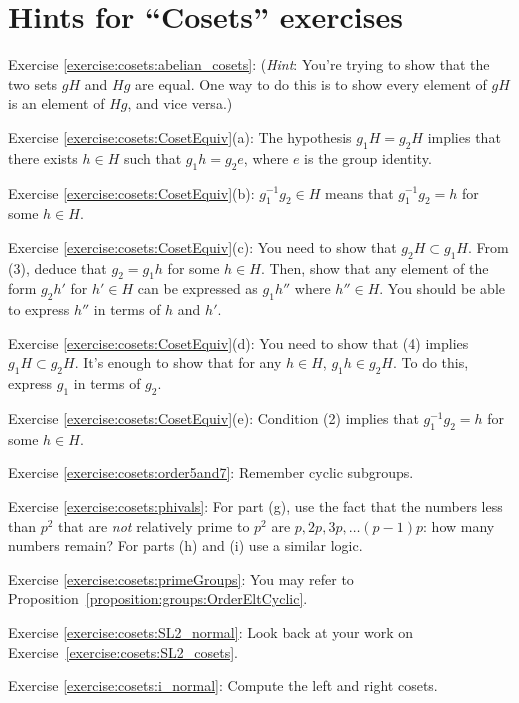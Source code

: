 \section{Hints for ``Cosets'' exercises}\label{sec:cosets:hints} 


\noindent Exercise \ref{exercise:cosets:abelian_cosets}:  (\emph{Hint}: You're trying to show that the two sets $gH$ and $Hg$ are equal. One way to do this is to show every element of $gH$ is an element of $Hg$, and vice versa.)


\noindent Exercise \ref{exercise:cosets:CosetEquiv}(a): The hypothesis $g_1 H = g_2 H$ implies that there exists $h \in H$ such that $g_1 h  = g_2 e$, where $e$ is the group identity. 

\noindent Exercise \ref{exercise:cosets:CosetEquiv}(b):   $g_1^{-1} g_2 \in H$ means that $g_1^{-1} g_2 = h$ for some $h \in H$. 

\noindent Exercise \ref{exercise:cosets:CosetEquiv}(c):   You need to show that $g_2 H \subset g_1 H$. From (3), deduce that $g_2 = g_1 h$ for some $h \in H$. Then, show that any element of the form $g_2 h'$ for $h' \in H$ can be expressed as $g_1 h''$ where $h'' \in H$. You should be able to express $h''$ in terms of $h$ and $h'$.

\noindent Exercise \ref{exercise:cosets:CosetEquiv}(d):   You need to show that (4) implies $g_1H \subset g_2H$. It's enough to show that for any $h \in H$,  $g_1 h \in g_2 H$. To do this, express $g_1$ in terms of $g_2$. 

\noindent Exercise \ref{exercise:cosets:CosetEquiv}(e):    Condition (2) implies that $g_1^{-1} g_2 = h$ for some $h \in H$.

\noindent Exercise \ref{exercise:cosets:order5and7}:  Remember cyclic subgroups.

\noindent Exercise \ref{exercise:cosets:phivals}:   For part (g), use the fact that the numbers less than $p^2$ that are \emph{not} relatively prime to $p^2$ are $p, 2p, 3p, \ldots (p-1)p$: how many numbers remain? For parts (h) and (i) use a similar logic.
 
\noindent Exercise \ref{exercise:cosets:primeGroups}:
You may refer to Proposition~\ref{proposition:groups:OrderEltCyclic}.

\noindent Exercise \ref{exercise:cosets:SL2_normal}:
Look back at your work on Exercise~\ref{exercise:cosets:SL2_cosets}.

\noindent Exercise \ref{exercise:cosets:i_normal}:
Compute the left and right cosets.

